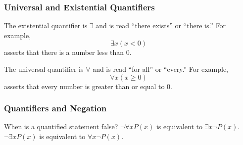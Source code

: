 \documentclass[11pt, compress]{beamer}
\begin{document}
\begin{frame}
\frametitle{Universal and Existential Quantifiers}
 The existential quantifier is \(\exists\) and is read ``there exists'' or ``there is.'' For example,%
\begin{equation*}
\exists x (x \lt 0)
\end{equation*}
asserts that there is a number less than 0.
 
\pause 

The universal quantifier is \(\forall\) and is read ``for all'' or ``every.'' For example,%
\begin{equation*}
\forall x (x \ge 0)
\end{equation*}
asserts that every number is greater than or equal to 0.
\end{frame}
 
\begin{frame}
\frametitle{Quantifiers and Negation}
 When is a quantified statement false?
 \(\neg \forall x P(x)\) is equivalent to \(\exists x \neg P(x)\).
 \(\neg \exists x P(x)\) is equivalent to \(\forall x \neg P(x)\).
\end{frame}
 
\end{document}
